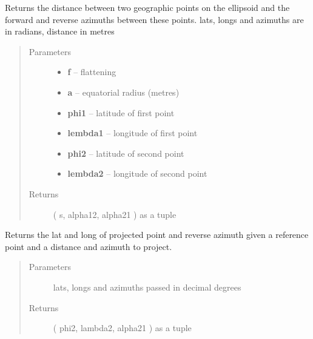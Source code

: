 \documentclass[letterpaper,10pt,english]{sphinxmanual}
\begin{document}
\begin{fulllineitems}
\label{docs/utilities:vincenty.vinc_dist}
Returns the distance between two geographic points on the ellipsoid
and the forward and reverse azimuths between these points.
lats, longs and azimuths are in radians, distance in metres
\begin{quote}\begin{description}
\item[{Parameters}] \leavevmode\begin{itemize}
\item {} 
\textbf{f} -- flattening

\item {} 
\textbf{a} -- equatorial radius (metres)

\item {} 
\textbf{phi1} -- latitude of first point

\item {} 
\textbf{lembda1} -- longitude of first point

\item {} 
\textbf{phi2} -- latitude of second point

\item {} 
\textbf{lembda2} -- longitude of second point

\end{itemize}

\item[{Returns }] \leavevmode
( s, alpha12,  alpha21 ) as a tuple

\end{description}\end{quote}

\end{fulllineitems}



\begin{fulllineitems}
\label{docs/utilities:vincenty.vinc_pt}
Returns the lat and long of projected point and reverse azimuth
given a reference point and a distance and azimuth to project.
\begin{quote}\begin{description}
\item[{Parameters }] \leavevmode
lats, longs and azimuths passed in decimal degrees

\item[{Returns }] \leavevmode
( phi2,  lambda2,  alpha21 ) as a tuple

\end{description}\end{quote}

\end{fulllineitems}
\end{document}
